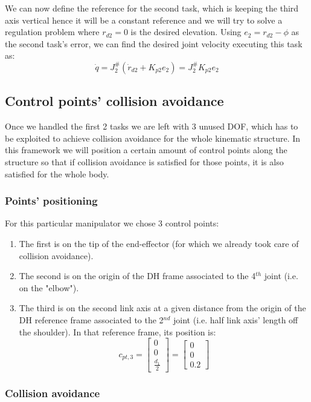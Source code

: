 \documentclass[12pt, a4paper]{article}
\begin{document}
We can now define the reference for the second task, which is keeping the third axis vertical hence it will be a constant reference and we will try to solve a regulation problem where $r_{d2} = 0$ is the desired elevation. Using $e_2 = r_{d2} - \phi$ as the second task's error, we can find the desired joint velocity executing this task as:
\begin{equation}
\dot{q} = J_2^{\#}(\dot{r}_{d2} + K_{p2}e_2)=J_2^{\#}K_{p2}e_2
\end{equation}
\subsection[Tasks 3 \& 4]{Control points' collision avoidance}
Once we handled the first 2 tasks we are left with 3 unused DOF, which has to be exploited to achieve collision avoidance for the whole kinematic structure. In this framework we will position a certain amount of control points along the structure so that if collision avoidance is satisfied for those points, it is also satisfied for the whole body.

\subsubsection{Points' positioning}

For this particular manipulator we chose 3 control points:
\begin{enumerate}
\item The first is on the tip of the end-effector (for which we already took care of collision avoidance).
\item The second is on the origin of the DH frame associated to the 4$^{th}$ joint (i.e. on the "elbow").
\item The third is on the second link axis at a given distance from the origin of the DH reference frame associated to the 2$^{nd}$ joint (i.e. half link axis' length off the shoulder). In that reference frame, its position is:
\[c_{pt,3} = \begin{bmatrix}
0\\0\\ \frac{d_1}{2}
\end{bmatrix} = \begin{bmatrix}
0\\0\\ 0.2
\end{bmatrix}
\]
\end{enumerate}

\subsubsection{Collision avoidance}
\end{document}

